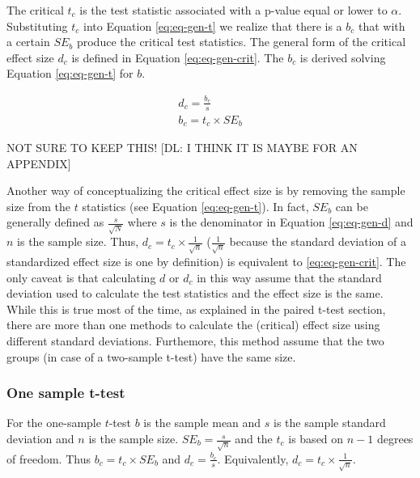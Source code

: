 \documentclass[
  man]{apa7}
\begin{document}
The critical \(t_c\) is the test statistic associated with a p-value equal or lower to \(\alpha\). Substituting \(t_c\) into Equation \eqref{eq:eq-gen-t} we realize that there is a \(b_c\) that with a certain \(SE_b\) produce the critical test statistics. The general form of the critical effect size \(d_c\) is defined in Equation \eqref{eq:eq-gen-crit}. The \(b_c\) is derived solving Equation \eqref{eq:eq-gen-t} for \(b\).

\begin{equation}
\begin{gathered}
    \label{eq:eq-gen-crit}
    d_c = \frac{b_c}{s} \\
    b_c = t_c \times SE_b
\end{gathered}
\end{equation}

NOT SURE TO KEEP THIS! {[}DL: I THINK IT IS MAYBE FOR AN APPENDIX{]}

Another way of conceptualizing the critical effect size is by removing the sample size from the \(t\) statistics (see Equation \eqref{eq:eq-gen-t}). In fact, \(SE_b\) can be generally defined as \(\frac{s}{\sqrt{N}}\) where \(s\) is the denominator in Equation \eqref{eq:eq-gen-d} and \(n\) is the sample size. Thus, \(d_c = t_c \times \frac{1}{\sqrt{n}}\) (\(\frac{1}{\sqrt{n}}\) because the standard deviation of a standardized effect size is one by definition) is equivalent to \eqref{eq:eq-gen-crit}. The only caveat is that calculating \(d\) or \(d_c\) in this way assume that the standard deviation used to calculate the test statistics and the effect size is the same. While this is true most of the time, as explained in the paired t-test section, there are more than one methods to calculate the (critical) effect size using different standard deviations. Furthemore, this method assume that the two groups (in case of a two-sample t-test) have the same size.

\hypertarget{one-sample-t-test}{%
\subsubsection{One sample t-test}\label{one-sample-t-test}}

For the one-sample \(t\)-test \(b\) is the sample mean and \(s\) is the sample standard deviation and \(n\) is the sample size. \(SE_b = \frac{s}{\sqrt{n}}\) and the \(t_c\) is based on \(n - 1\) degrees of freedom. Thus \(b_c = t_c \times SE_b\) and \(d_c = \frac{b_c}{s}\). Equivalently, \(d_c = t_c \times \frac{1}{\sqrt{n}}\).
\end{document}
